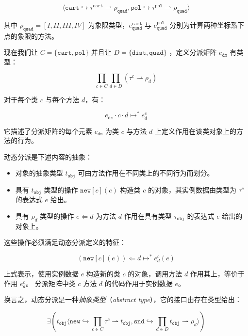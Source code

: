 $$ \langle \mathtt{cart} \hookrightarrow \tau^{\mathtt{cart}} \rightharpoonup \rho_{\mathtt{quad}}, \mathtt{pol} \hookrightarrow \tau^{\mathtt{pol}} \rightharpoonup \rho_{\mathtt{quad}} \rangle $$

其中 $ \rho_{\mathtt{quad}} = [I, II, III, IV] $ 为象限类型，$ e^{\mathtt{cart}}_{\mathtt{quad}} $ 与 $ e^{\mathtt{pol}}_{\mathtt{quad}} $ 分别为计算两种坐标系下点的象限的方法。

现在我们让 $ C = \{ \mathtt{cart}, \mathtt{pol} \} $ 并且让 $ D = \{ \mathtt{dist}, \mathtt{quad} \} $ ，定义分派矩阵 $ e_{\mathtt{dm}} $ 有类型：

$$ \prod_{c \in C} \prod_{d \in D} (\tau^{c} \rightharpoonup \rho_{d})$$

对于每个类 $ c $ 与每个方法 $ d $，有：

$$ e_{\mathtt{dm}} \cdot c \cdot d \longmapsto^{*} e^{c}_{d} $$

它描述了分派矩阵的每个元素 $ e_{\mathtt{dm}} $ 为类 $ c $ 与方法 $ d $ 上定义作用在该类对象上的方法的行为。

动态分派是下述内容的抽象：

\begin{itemize}
\item 对象的抽象类型 $ t_{\mathtt{obj}} $ 可由方法作用在不同类上的不同行为而划分。
\item 具有 $t_{\mathtt{obj}}$ 类型的操作 $ \mathtt{new}[c](e) $ 构造类 $ c $ 的对象，其实例数据由类型为 $\tau^{c}$ 的表达式 $e$ 给出。
\item 具有 $\rho_{d}$ 类型的操作 $ e \Leftarrow d $ 为方法 $ d $ 作用在具有类型 $\tau_{\mathtt{obj}}$ 的表达式 $e$ 给出的对象上。
\end{itemize}

这些操作必须满足动态分派定义的特征：

$$ (\mathtt{new}[c](e)) \Leftarrow d \longmapsto^{*} e^{c}_{d}(e) $$

上式表示，使用实例数据 $e$ 构造新的类 $c$ 的对象，调用方法 $d$ 作用其上，等价于作用 $e^{c}_d$。
分派矩阵中类 $c$ 方法 $d$ 的代码作用于实例数据 $e$。

换言之，动态分派是一种\textit{抽象类型}（\textit{abstract type}），它的接口由存在类型给出：

\begin{equation}\label{euqation:26.1}
\exists(t_{\mathtt{obj}}\langle \mathtt{new} \hookrightarrow \prod_{c \in C} \tau^{c} \rightharpoonup t_{\mathtt{obj}}, \mathtt{snd} \hookrightarrow \prod_{d \in D} t_{\mathtt{obj}} \rightharpoonup \rho_{d} \rangle)
\end{equation}

